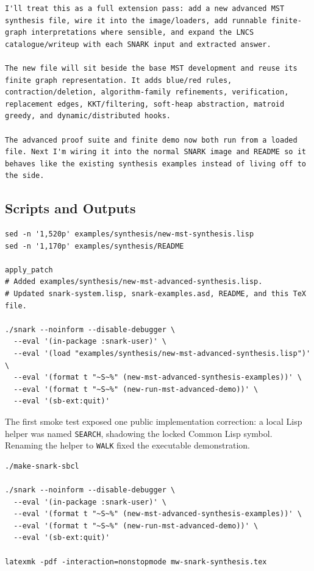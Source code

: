 \documentclass[runningheads]{llncs}
\begin{document}
\begin{lstlisting}
I'll treat this as a full extension pass: add a new advanced MST synthesis file, wire it into the image/loaders, add runnable finite-graph interpretations where sensible, and expand the LNCS catalogue/writeup with each SNARK input and extracted answer.

The new file will sit beside the base MST development and reuse its finite graph representation. It adds blue/red rules, contraction/deletion, algorithm-family refinements, verification, replacement edges, KKT/filtering, soft-heap abstraction, matroid greedy, and dynamic/distributed hooks.

The advanced proof suite and finite demo now both run from a loaded file. Next I'm wiring it into the normal SNARK image and README so it behaves like the existing synthesis examples instead of living off to the side.
\end{lstlisting}

\subsection{Scripts and Outputs}

\begin{lstlisting}
sed -n '1,520p' examples/synthesis/new-mst-synthesis.lisp
sed -n '1,170p' examples/synthesis/README

apply_patch
# Added examples/synthesis/new-mst-advanced-synthesis.lisp.
# Updated snark-system.lisp, snark-examples.asd, README, and this TeX file.

./snark --noinform --disable-debugger \
  --eval '(in-package :snark-user)' \
  --eval '(load "examples/synthesis/new-mst-advanced-synthesis.lisp")' \
  --eval '(format t "~S~%" (new-mst-advanced-synthesis-examples))' \
  --eval '(format t "~S~%" (new-run-mst-advanced-demo))' \
  --eval '(sb-ext:quit)'
\end{lstlisting}
The first smoke test exposed one public implementation correction: a local Lisp
helper was named \texttt{SEARCH}, shadowing the locked Common Lisp symbol.
Renaming the helper to \texttt{WALK} fixed the executable demonstration.

\begin{lstlisting}
./make-snark-sbcl

./snark --noinform --disable-debugger \
  --eval '(in-package :snark-user)' \
  --eval '(format t "~S~%" (new-mst-advanced-synthesis-examples))' \
  --eval '(format t "~S~%" (new-run-mst-advanced-demo))' \
  --eval '(sb-ext:quit)'

latexmk -pdf -interaction=nonstopmode mw-snark-synthesis.tex
\end{lstlisting}
\end{document}

